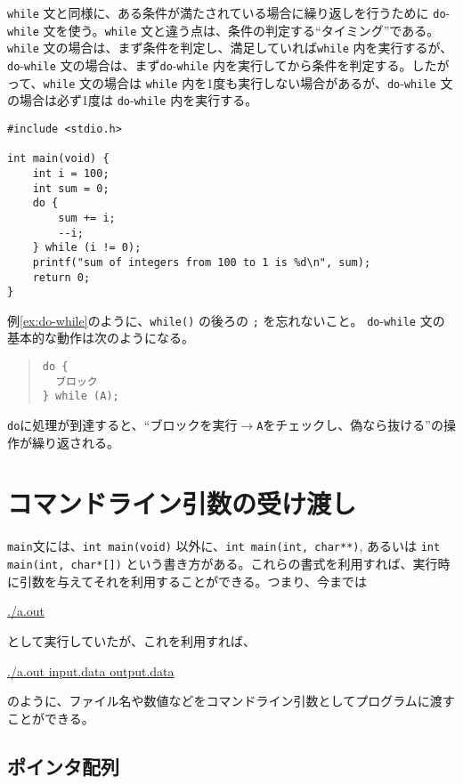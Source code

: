 \texttt{while} 文と同様に、ある条件が満たされている場合に繰り返しを行うために \texttt{do}-\texttt{while} 文を使う。\texttt{while} 文と違う点は、条件の判定する``タイミング''である。\texttt{while} 文の場合は、まず条件を判定し、満足していれば\texttt{while} 内を実行するが、\texttt{do}-\texttt{while} 文の場合は、まず\texttt{do}-\texttt{while} 内を実行してから条件を判定する。したがって、\texttt{while} 文の場合は \texttt{while} 内を1度も実行しない場合があるが、\texttt{do}-\texttt{while} 文の場合は必ず1度は \texttt{do}-\texttt{while} 内を実行する。
\begin{reidai}\label{ex:do-while}
    \begin{verbatim}
#include <stdio.h>

int main(void) {
    int i = 100;
    int sum = 0;
    do {
        sum += i;
        --i;
    } while (i != 0);
    printf("sum of integers from 100 to 1 is %d\n", sum);
    return 0;
}
\end{verbatim}
\end{reidai} \noindent
例\ref{ex:do-while}のように、\texttt{while()} の後ろの \texttt{;} を忘れないこと。
\texttt{do}-\texttt{while} 文の基本的な動作は次のようになる。
\begin{quote}
    \begin{verbatim}
do {
  ブロック
} while (A);
\end{verbatim}
\end{quote}
\texttt{do}に処理が到達すると、``ブロックを実行\(\rightarrow\)\texttt{A}をチェックし、偽なら抜ける''の操作が繰り返される。

\section{コマンドライン引数の受け渡し}
\texttt{main}文には、\texttt{int main(void)} 以外に、\texttt{int main(int, char**)}, あるいは \texttt{int main(int, char*[])} という書き方がある。これらの書式を利用すれば、実行時に引数を与えてそれを利用することができる。つまり、今までは
\begin{commandline2}
    \prompt \underline{./a.out}
\end{commandline2} \noindent
として実行していたが、これを利用すれば、
\begin{commandline2}
    \prompt \underline{./a.out input.data output.data}
\end{commandline2} \noindent
のように、ファイル名や数値などをコマンドライン引数としてプログラムに渡すことができる。

\subsection{ポインタ配列}

